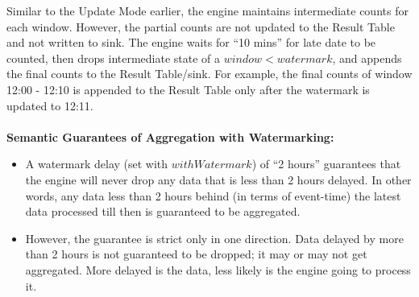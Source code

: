 \documentclass[10pt,a4paper]{article}
\newcommand{\nline}{\\~\\}
\begin{document}
 Similar to the Update Mode earlier, the engine maintains intermediate counts for each window. However, the partial counts are not updated to the Result Table and not written to sink. The engine waits for “10 mins” for late date to be counted, then drops intermediate state of a $window < watermark$, and appends the final counts to the Result Table/sink. For example, the final counts of window 12:00 - 12:10 is appended to the Result Table only after the watermark is updated to 12:11.
 \nline
 \textbf{Semantic Guarantees of Aggregation with Watermarking:}
 \begin{itemize}
 	\item A watermark delay (set with $withWatermark$) of “2 hours” guarantees that the engine will never drop any data that is less than 2 hours delayed. In other words, any data less than 2 hours behind (in terms of event-time) the latest data processed till then is guaranteed to be aggregated.
 	\item However, the guarantee is strict only in one direction. Data delayed by more than 2 hours is not guaranteed to be dropped; it may or may not get aggregated. More delayed is the data, less likely is the engine going to process it.
 \end{itemize}
\end{document}
